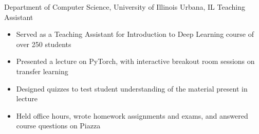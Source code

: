 
        {Department of Computer Science, University of Illinois}
        {Urbana, IL}
        {Teaching Assistant}
        {}{
    \begin{itemize}
        \item Served as a Teaching Assistant for Introduction to Deep Learning course of over 250 students
        \item Presented a lecture on PyTorch, with interactive breakout room sessions on transfer learning
        \item Designed quizzes to test student understanding of the material present in lecture
        \item Held office hours, wrote homework assignments and exams, and answered course questions on Piazza
    \end{itemize}
}

